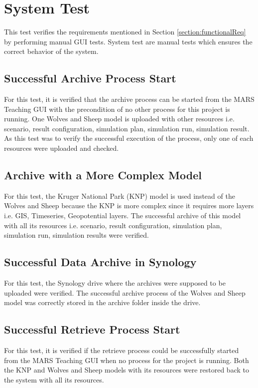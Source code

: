 \section{System Test}
This test verifies the requirements mentioned in Section \ref{section:functionalReq} by performing manual GUI tests. System test are manual tests
which ensures the correct behavior of the system.

\subsection{Successful Archive Process Start}
For this test, it is verified that the archive process can be started from the MARS Teaching GUI with the precondition of no other process
for this project is running. One Wolves and Sheep model is uploaded with other resources i.e. scenario, result configuration,
simulation plan, simulation run, simulation result. As this test was to verify the successful execution of the process, only one of each resources
were uploaded and checked.

\subsection{Archive with a More Complex Model}
For this test, the Kruger National Park (KNP) model is used instead of the Wolves and Sheep because the KNP is more complex since it requires more layers
i.e. GIS, Timeseries, Geopotential layers. The successful archive of this model with all its resources i.e. scenario, result configuration, simulation plan, simulation run,
simulation results were verified. 

\subsection{Successful Data Archive in Synology}
For this test, the Synology drive where the archives were supposed to be uploaded were verified. The successful archive process of the Wolves and Sheep model
was correctly stored in the archive folder inside the drive.

\subsection{Successful Retrieve Process Start}
For this test, it is verified if the retrieve process could be successfully started from the MARS Teaching GUI when no process for the project is running.
Both the KNP and Wolves and Sheep models with its resources were restored back to the system with all its resources. 

